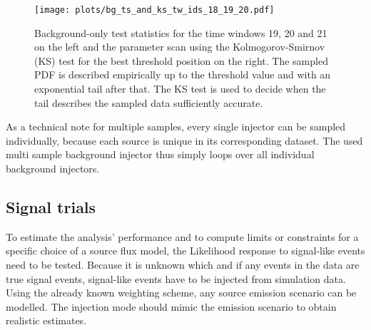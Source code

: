\begin{figure}[htbp]
  \centering
  \texttt{[image: plots/bg\_ts\_and\_ks\_tw\_ids\_18\_19\_20.pdf]}
  \caption[Background test statistics for the time windows 19, 20 and 21]{
    Background-only test statistics for the time windows 19, 20 and 21 on the left and the parameter scan using the Kolmogorov-Smirnov (KS) test for the best threshold position on the right.
    The sampled PDF is described empirically up to the threshold value and with an exponential tail after that.
    The KS test is used to decide when the tail describes the sampled data sufficiently accurate.
  }
  \label{fig:bg_ts_and_ks_tw_ids_18_19_20}
\end{figure}

As a technical note for multiple samples, every single injector can be sampled individually, because each source is unique in its corresponding dataset.
The used multi sample background injector thus simply loops over all individual background injectors.

\subsection*{Signal trials}
To estimate the analysis' performance and to compute limits or constraints for a specific choice of a source flux model, the Likelihood response to signal-like events need to be tested.
Because it is unknown which and if any events in the data are true signal events, signal-like events have to be injected from simulation data.
Using the already known weighting scheme, any source emission scenario can be modelled.
The injection mode should mimic the emission scenario to obtain realistic estimates.

